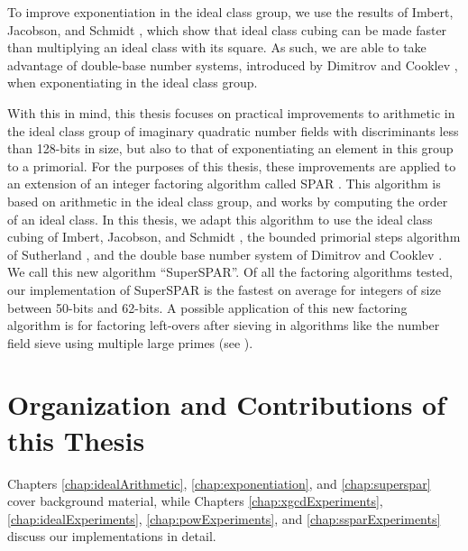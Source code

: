 \documentclass{ucalgthes1}
\theoremstyle{definition}
\begin{document}
To improve exponentiation in the ideal class group, we use the results of Imbert, Jacobson, and Schmidt \cite{Imbert2010}, which show that ideal class cubing can be made faster than multiplying an ideal class with its square.  As such, we are able to take advantage of double-base number systems, introduced by Dimitrov and Cooklev \cite{Dimitrov1995a, Dimitrov1995b}, when exponentiating in the ideal class group.  

With this in mind, this thesis focuses on practical improvements to arithmetic in the ideal class group of imaginary quadratic number fields with discriminants less than 128-bits in size, but also to that of exponentiating an element in this group to a primorial.  For the purposes of this thesis, these improvements are applied to an extension of an integer factoring algorithm called SPAR \cite{Schnorr1984}.  This algorithm is based on arithmetic in the ideal class group, and works by computing the order of an ideal class.  In this thesis, we adapt this algorithm to use the ideal class cubing of Imbert, Jacobson, and Schmidt \cite{Imbert2010}, the bounded primorial steps algorithm of Sutherland \cite{Sutherland2007}, and the double base number system of Dimitrov and Cooklev \cite{Dimitrov1995a, Dimitrov1995b}.  We call this new algorithm ``SuperSPAR''.  Of all the factoring algorithms tested, our implementation of SuperSPAR is the fastest on average for integers of size between 50-bits and 62-bits.  A possible application of this new factoring algorithm is for factoring left-overs after sieving in algorithms like the number field sieve using multiple large primes (see \cite[\S 6.1.4]{Crandall2001}).


\section{Organization and Contributions of this Thesis}

Chapters \ref{chap:idealArithmetic}, \ref{chap:exponentiation}, and \ref{chap:superspar} cover background material, while Chapters \ref{chap:xgcdExperiments}, \ref{chap:idealExperiments}, \ref{chap:powExperiments}, and \ref{chap:ssparExperiments} discuss our implementations in detail.
\end{document}

